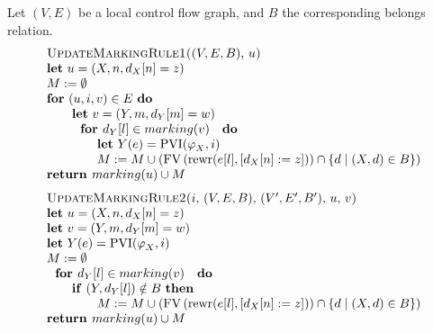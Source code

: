 Let $\left( V,E\right) $ be a local control flow graph, and $B$ the
corresponding belongs relation.%
\begin{equation*}
\begin{tabular}{l}
\textsc{UpdateMarkingRule1(}$(V,E,B)$, $u$\textsc{)} \\ 
\textbf{let} $u=\left( X,n,d_{X}[n]=z\right) $ \\ 
$M:=\emptyset $ \\ 
\textbf{for} $(u,i,v)\in E$ \textbf{do} \\ 
$\qquad $\textbf{let} $v=\left( Y,m,d_{Y}[m]=w\right) $ \\ 
$\qquad \text{\textbf{for }}d_{Y}[l]\in marking(v)\text{ \textbf{do}}$ \\ 
$\qquad \qquad $\textbf{let} $Y(e)=\mathrm{PVI}(\varphi _{X},i)$ \\ 
$\qquad \qquad M:=M\cup \left( \mathrm{FV}\left( \mathrm{rewr}(e[l],\left[
d_{X}[n]:=z\right] )\right) \cap \{d\mid (X,d)\in B\}\right) $ \\ 
\textbf{return }$marking(u)\cup M$%
\end{tabular}%
\end{equation*}%
\begin{equation*}
\begin{tabular}{l}
\textsc{UpdateMarkingRule2(}$i$, $\left( V,E,B\right) $, $\left( V^{\prime
},E^{\prime },B^{\prime }\right) $, $u$, $v$\textsc{)} \\ 
\textbf{let} $u=\left( X,n,d_{X}[n]=z\right) $ \\ 
\textbf{let} $v=\left( Y,m,d_{Y}[m]=w\right) $ \\ 
\textbf{let} $Y(e)=\mathrm{PVI}(\varphi _{X},i)$ \\ 
$M:=\emptyset $ \\ 
$\text{\textbf{for }}d_{Y}[l]\in marking(v)\text{ \textbf{do}}$ \\ 
$\qquad $\textbf{if} $\left( Y,d_{Y}[l]\right) \notin B$ \textbf{then} \\ 
$\qquad \qquad M:=M\cup \left( \mathrm{FV}\left( \mathrm{rewr}(e[l],\left[
d_{X}[n]:=z\right] )\right) \cap \{d\mid (X,d)\in B\}\right) $ \\ 
\textbf{return }$marking(u)\cup M$%
\end{tabular}%
\end{equation*}

\bigskip

\newpage

